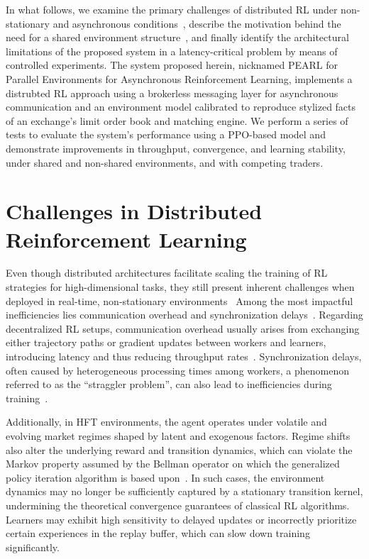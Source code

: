 In what follows, we examine the primary challenges of distributed RL under non-stationary and asynchronous conditions~\citep{Huh2023}, 
describe the motivation behind the need for a shared environment structure~\citep{Cho2023,Furukawa2022},
and finally identify the architectural limitations of the proposed system in a latency-critical problem by means of controlled experiments.
The system proposed herein, nicknamed PEARL for Parallel Environments for Asynchronous Reinforcement Learning,
implements a distrubted RL approach using a brokerless messaging layer for asynchronous communication and an environment model
calibrated to reproduce stylized facts of an exchange's limit order book and matching engine.
We perform a series of tests to evaluate the system's performance using a PPO-based model and demonstrate improvements in
throughput, convergence, and learning stability, under shared and non-shared environments, and with competing traders.


\section{Challenges in Distributed Reinforcement Learning}
\label{sec:challenges}

Even though distributed architectures facilitate scaling the training of RL strategies for
high-dimensional tasks, they still present inherent challenges when deployed in real-time, non-stationary environments~\citep{He2022, Jia2024}
Among the most impactful inefficiencies lies communication overhead and synchronization delays~\citep{Song2023}.
Regarding decentralized RL setups, communication overhead usually arises from exchanging either trajectory paths or gradient updates
between workers and learners, introducing latency and thus reducing throughput rates~\citep{Espeholt2018}.
Synchronization delays, often caused by heterogeneous processing times among workers, a phenomenon referred to as the ``straggler problem'',
can also lead to inefficiencies during training~\citep{Lu2021}.

Additionally, in HFT environments, the agent operates under volatile and evolving market regimes shaped by latent and exogenous factors.
Regime shifts also alter the underlying reward and transition dynamics, which can violate the Markov property assumed by the Bellman operator
on which the generalized policy iteration algorithm is based upon~\citep{Rabindrajit2024}.
In such cases, the environment dynamics may no longer be sufficiently captured by a stationary transition kernel,
undermining the theoretical convergence guarantees of classical RL algorithms.
Learners may exhibit high sensitivity to delayed updates or incorrectly prioritize certain experiences in the replay buffer,
which can slow down training significantly.

